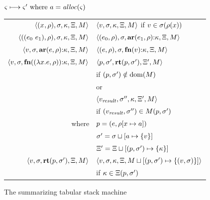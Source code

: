 \begin{figure}
  \centering
  $\varsigma \longmapsto \varsigma' \text{ where } a = \mathit{alloc}(\varsigma)$ \\
  \begin{tabular}{r|l}
    \hline
    $\langle (x^{{}}, \rho), \sigma, \kappa, \Xi, M \rangle$
    &
    $\langle v,\sigma,\kappa, \Xi, M \rangle$ if $v \in \sigma(\rho(x))$
    \\
    $\langle ((e_{0}\ e_{1}){}, \rho), \sigma, \kappa, \Xi, M \rangle$
    &
    $\langle (e_{0}, \rho), \sigma, \mathbf{ar}{}(e_{1},\rho){\tt :} \kappa, \Xi, M \rangle$
    \\
    $\langle v, \sigma, \mathbf{ar}{}(e,\rho){\tt :} \kappa, \Xi, M \rangle$
    &
    $\langle (e, \rho), \sigma, \mathbf{fn}{}(v){\tt :} \kappa, \Xi, M \rangle$
    \\
    $\langle v,\sigma,\mathbf{fn}{}((\lambda{} x. e, \rho)){\tt :} \kappa,\Xi,M \rangle$
    & %
    $\langle p,
          \sigma',
          \mathbf{rt}(p, \sigma'),
          \Xi',
          M \rangle$
     \\ & \quad if $(p, \sigma') \notin \text{dom}(M)$
\\
    & or \\
    & $\langle v_\mathit{result},
            \sigma'',
            \kappa,
            \Xi',
            M \rangle$
    \\ & \quad if $(v_\mathit{result},\sigma'') \in M(p,\sigma')$
    \\ %
    where & $p = (e, \rho[x \mapsto a])$ \\
          & $\sigma' = \sigma\sqcup[a \mapsto \{ v \}]$ \\
          & $\Xi' = \Xi\sqcup[(p, \sigma') \mapsto \{ \kappa \}]$
    \\
    $\langle v, \sigma, \mathbf{rt}(p,\sigma'), \Xi, M \rangle$
    &
    $\langle v, \sigma, \kappa, \Xi, M\sqcup[(p, \sigma') \mapsto \{ (v,\sigma) \}] \rangle$
    \\ & \quad if $\kappa \in \Xi(p, \sigma')$
  \end{tabular}
  \caption{The summarizing tabular stack machine}
  \label{fig:summary-semantics}
\end{figure}

